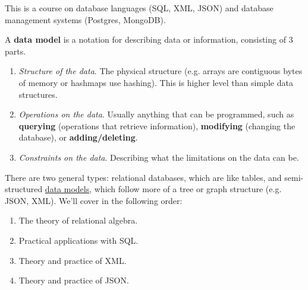 This is a course on database languages (SQL, XML, JSON) and database management systems (Postgres, MongoDB). 

\begin{definition}
  \label{def:data-model}
  A \textbf{data model} is a notation for describing data or information, consisting of 3 parts. 
  \begin{enumerate}
    \item \textit{Structure of the data}. The physical structure (e.g. arrays are contiguous bytes of memory or hashmaps use hashing). This is higher level than simple data structures. 
    \item \textit{Operations on the data}. Usually anything that can be programmed, such as \textbf{querying} (operations that retrieve information), \textbf{modifying} (changing the database), or \textbf{adding/deleting}. 
    \item \textit{Constraints on the data}. Describing what the limitations on the data can be. 
  \end{enumerate}
\end{definition}

There are two general types: relational databases, which are like tables, and semi-structured \hyperref[def:data-model]{data models}, which follow more of a tree or graph structure (e.g. JSON, XML). We'll cover in the following order: 
\begin{enumerate}
  \item The theory of relational algebra. 
  \item Practical applications with SQL. 
  \item Theory and practice of XML.  
  \item Theory and practice of JSON. 
\end{enumerate}

